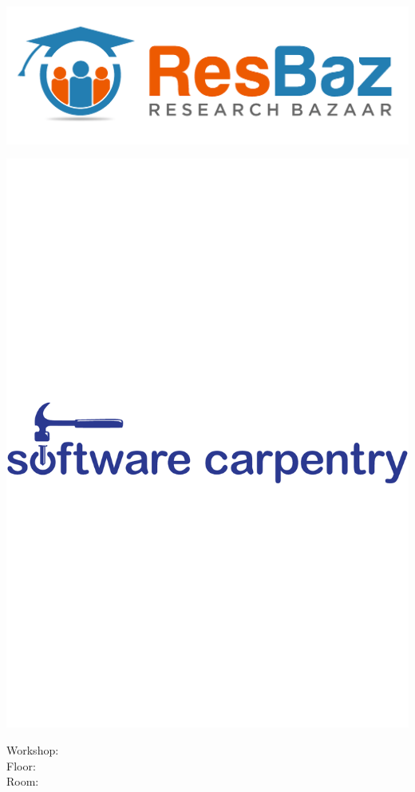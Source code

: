 \documentclass[landscape, a4paper]{article}
\begin{document}
\begin{minipage}{\linewidth}
    \begin{flushleft}
	\vspace{-2cm}
    \hspace{3cm}\includegraphics[width=0.7\linewidth]{res_baz_logo.png}
    \end{flushleft}
    \hspace{7cm}\includegraphics[width=0.4\linewidth]{logo_blue.pdf}
\end{minipage}
\begin{flushleft}
    \vspace{2cm}
\Huge
Workshop: \hrulefill\\
Floor: \hrulefill \\
Room: \hrulefill
\end{flushleft}
\end{document}
